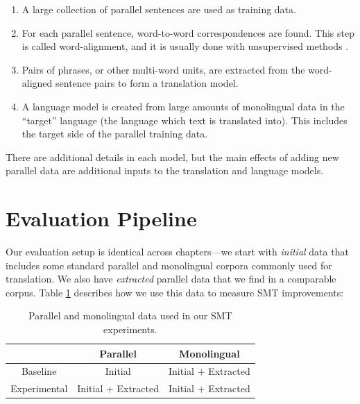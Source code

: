 \begin{enumerate}
\item A large collection of parallel sentences are used as training data.
\item For each parallel sentence, word-to-word correspondences are found. This
step is called word-alignment, and it is usually done with unsupervised methods
\citep{Brown93,Vogel96}.
\item Pairs of phrases, or other multi-word units, are extracted from the
word-aligned sentence pairs to form a translation model.
\item A language model is created from large amounts of monolingual data in the
``target'' language (the language which text is translated into). This includes
the target side of the parallel training data.
\end{enumerate}

There are additional details in each model, but the main effects of adding new
parallel data are additional inputs to the translation and language models.

\section{Evaluation Pipeline}
Our evaluation setup is identical across chapters---we start with {\em initial}
data that includes some standard parallel and monolingual corpora commonly used for 
translation. We also have {\em extracted} parallel data that we find in a comparable
corpus. Table \ref{tab:exp_setup} describes how we use this data to measure SMT
improvements:

\begin{table}
\begin{center}
\begin{tabular}{|c||c|c|}
\hline
& Parallel & Monolingual \\
\hline
Baseline & Initial & Initial + Extracted \\
\hline
Experimental & Initial + Extracted & Initial + Extracted \\
\hline
\end{tabular}
\end{center}
\label{tab:exp_setup}
\caption{Parallel and monolingual data used in our SMT experiments.}
\end{table}

